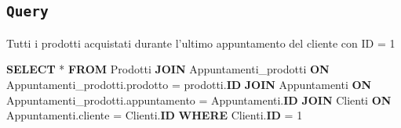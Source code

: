 \documentclass[]{article}
\newenvironment{Shaded}{}{}
\newcommand{\DecValTok}[1]{\textcolor[rgb]{0.25,0.63,0.44}{#1}}
\newcommand{\KeywordTok}[1]{\textcolor[rgb]{0.00,0.44,0.13}{\textbf{#1}}}
\newcommand{\NormalTok}[1]{#1}
\newcommand{\OperatorTok}[1]{\textcolor[rgb]{0.40,0.40,0.40}{#1}}
\begin{document}
\hypertarget{query}{%
\subsection{\texorpdfstring{\texttt{Query}}{Query}}\label{query}}

Tutti i prodotti acquistati durante l'ultimo appuntamento del cliente
con ID = 1

\begin{Shaded}
\begin{Highlighting}[]
\KeywordTok{SELECT} \OperatorTok{*} 
\KeywordTok{FROM}\NormalTok{ Prodotti}
\KeywordTok{JOIN}\NormalTok{ Appuntamenti_prodotti}
\KeywordTok{ON}\NormalTok{ Appuntamenti_prodotti.prodotto }\OperatorTok{=}\NormalTok{ prodotti.}\KeywordTok{ID}
\KeywordTok{JOIN}\NormalTok{ Appuntamenti}
\KeywordTok{ON}\NormalTok{ Appuntamenti_prodotti.appuntamento }\OperatorTok{=}\NormalTok{ Appuntamenti.}\KeywordTok{ID}
\KeywordTok{JOIN}\NormalTok{ Clienti}
\KeywordTok{ON}\NormalTok{ Appuntamenti.cliente }\OperatorTok{=}\NormalTok{ Clienti.}\KeywordTok{ID}
\KeywordTok{WHERE}\NormalTok{ Clienti.}\KeywordTok{ID} \OperatorTok{=} \DecValTok{1}
\end{Highlighting}
\end{Shaded}
\end{document}
